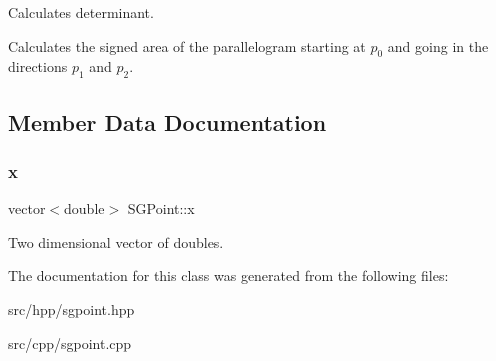 Calculates determinant. 

Calculates the signed area of the parallelogram starting at $p_0$ and going in the directions $p_1$ and $p_2$. 

\subsection{Member Data Documentation}
\mbox{\label{classSGPoint_ae4b95f14f367daa07dc982c5bed53a7a}} 
\subsubsection{\texorpdfstring{x}{x}}
{\footnotesize\ttfamily vector$<$double$>$ S\+G\+Point\+::x\hspace{0.3cm}{\ttfamily [protected]}}

Two dimensional vector of doubles. 

The documentation for this class was generated from the following files\+:\begin{DoxyCompactItemize}
\item 
src/hpp/sgpoint.\+hpp\item 
src/cpp/sgpoint.\+cpp\end{DoxyCompactItemize}
